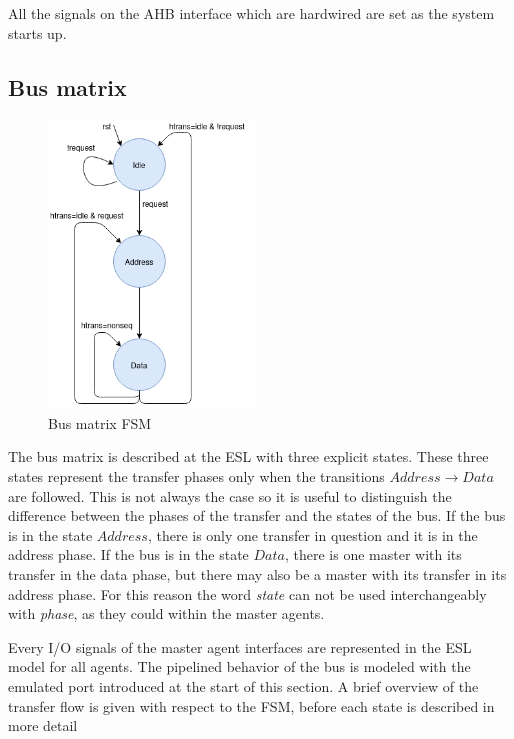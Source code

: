 All the signals on the AHB interface which are hardwired are set as the system starts up. 

\newpage
\subsection{Bus matrix}
\label{sub:bus-matrix}
\begin{figure}
\includegraphics[width=5.5cm]{figs/ESL/Bus_fsm_new.png}
\caption{Bus matrix FSM}\label{fig:busfsm}
\end{figure}
The bus matrix is described at the ESL with three explicit states. These three states represent the transfer phases only when the transitions $Address\rightarrow Data$ are followed. This is not always the case so it is useful to distinguish the difference between the phases of the transfer and the states of the bus. If the bus is in the state $Address$, there is only one transfer in question and it is in the address phase. If the bus is in the state $Data$, there is one master with its transfer in the data phase, but there may also be a master with its transfer in its address phase. For this reason the word \textit{state} can not be used interchangeably with \textit{phase}, as they could within the master agents.\par
Every I/O signals of the master agent interfaces are represented in the ESL model for all agents. The pipelined behavior of the bus is modeled with the emulated port introduced at the start of this section. A brief overview of the transfer flow is given with respect to the FSM, before each state is described in more detail \par

